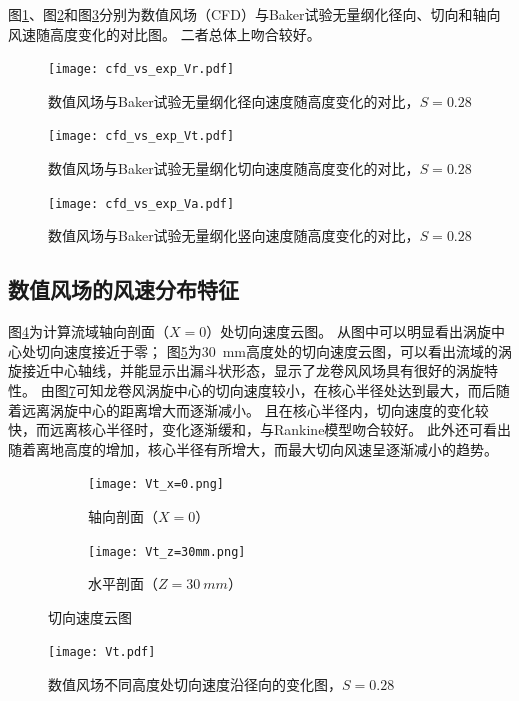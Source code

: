 图\ref{fig:cfd_vs_exp_Vr}、图\ref{fig:cfd_vs_exp_Vt}和图\ref{fig:cfd_vs_exp_Va}分别为数值风场（CFD）与Baker试验无量纲化径向、切向和轴向风速随高度变化的对比图。
二者总体上吻合较好。

\begin{figure}[!htbp]
	\centering
	\texttt{[image: cfd\_vs\_exp\_Vr.pdf]}
	\caption{数值风场与Baker试验无量纲化径向速度随高度变化的对比，$S=0.28$}
	\label{fig:cfd_vs_exp_Vr}
\end{figure}
\begin{figure}[!htbp]
	\centering
	\texttt{[image: cfd\_vs\_exp\_Vt.pdf]}
	\caption{数值风场与Baker试验无量纲化切向速度随高度变化的对比，$S=0.28$}
	\label{fig:cfd_vs_exp_Vt}
\end{figure}
\begin{figure}[!htbp]
	\centering
	\texttt{[image: cfd\_vs\_exp\_Va.pdf]}
	\caption{数值风场与Baker试验无量纲化竖向速度随高度变化的对比，$S=0.28$}
	\label{fig:cfd_vs_exp_Va}
\end{figure}

\subsection{数值风场的风速分布特征}
图\ref{fig:Vt-x=0}为计算流域轴向剖面（$X=0$）处切向速度云图。
从图中可以明显看出涡旋中心处切向速度接近于零；
图\ref{fig:Vt-z=30mm}为\SI{30}{mm}高度处的切向速度云图，可以看出流域的涡旋接近中心轴线，并能显示出漏斗状形态，显示了龙卷风风场具有很好的涡旋特性。
由图\ref{fig:Vt}可知龙卷风涡旋中心的切向速度较小，在核心半径处达到最大，而后随着远离涡旋中心的距离增大而逐渐减小。
且在核心半径内，切向速度的变化较快，而远离核心半径时，变化逐渐缓和，与Rankine模型吻合较好。
此外还可看出随着离地高度的增加，核心半径有所增大，而最大切向风速呈逐渐减小的趋势。
\begin{figure}[!htbp]
	\begin{subfigure}[b]{0.5\textwidth}
		\centering
		\texttt{[image: Vt\_x=0.png]}
		\caption{轴向剖面（$X=0$）}\label{fig:Vt-x=0}
	\end{subfigure}
	\begin{subfigure}[b]{0.5\textwidth}
		\centering
		\texttt{[image: Vt\_z=30mm.png]}
		\caption{水平剖面（$Z=\SI{30}{mm}$）}\label{fig:Vt-z=30mm}
	\end{subfigure}
	\caption{切向速度云图}\label{fig:Vt-contour}
\end{figure}

\begin{figure}
	\centering
	\texttt{[image: Vt.pdf]}
	\caption{数值风场不同高度处切向速度沿径向的变化图，$S=0.28$}
	\label{fig:Vt}
\end{figure}

